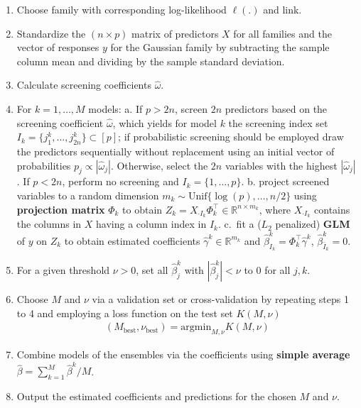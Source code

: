 \documentclass[
  article]{jss}
\begin{document}
\begin{enumerate}
\def\labelenumi{\arabic{enumi}.}
\item
  Choose family with corresponding log-likelihood \(\ell(.)\) and link.
\item
  Standardize the \((n\times p)\) matrix of predictors \(X\) for all
  families and the vector of responses \(y\) for the Gaussian family by
  subtracting the sample column mean and dividing by the sample standard
  deviation.
\item
  Calculate screening coefficients \(\hat\omega\).
\item
  For \(k=1,\dots,M\) models: a. If \(p>2n\), screen \(2n\) predictors
  based on the screening coefficient \(\hat\omega\), which yields for
  model \(k\) the screening index set
  \(I_k=\{j_1^k,\dots,j_{2n}^k\}\subset[p]\); if probabilistic screening
  should be employed draw the predictors sequentially without
  replacement using an initial vector of probabilities
  \(p_j\propto |\hat\omega_j|\). Otherwise, select the \(2n\) variables
  with the highest \(|\hat\omega_j|\). If \(p < 2n\), perform no
  screening and \(I_k=\{1,\dots,p\}\). b. project screened variables to
  a random dimension \(m_k\sim \text{Unif}\{\log(p),\dots,n/2\}\) using
  \textbf{projection matrix} \(\Phi_k\) to obtain
  \(Z_k=X_{\cdot I_k}\Phi_k^\top \in \mathbb{R}^{n\times m_k}\), where
  \(X_{\cdot I_k}\) contains the columns in \(X\) having a column index
  in \(I_k\). c.~fit a (\(L_2\) penalized) \textbf{GLM} of \(y\) on
  \(Z_k\) to obtain estimated coefficients
  \(\widehat\gamma^k\in\mathbb{R}^{m_k}\) and
  \(\hat \beta_{I_k}^k=\Phi_k^\top\widehat\gamma^k\),
  \(\hat \beta_{\bar I_k}^k=0\).
\item
  For a given threshold \(\nu>0\), set all \(\hat\beta_j^k\) with
  \(|\hat\beta_j^k|<\nu\) to \(0\) for all \(j,k\).
\item
  Choose \(M\) and \(\nu\) via a validation set or cross-validation by
  repeating steps 1 to 4 and employing a loss function on the test set
  \(K(M, \nu)\) \begin{align*}
      (M_{\text{best}},\nu_{\text{best}}) = \text{argmin}_{M,\nu}K(M,\nu)
    \end{align*}
\item
  Combine models of the ensembles via the coefficients using
  \textbf{simple average} \(\hat \beta = \sum_{k=1}^M\hat \beta^k / M\).
\item
  Output the estimated coefficients and predictions for the chosen \(M\)
  and \(\nu\).
\end{enumerate}
\end{document}
